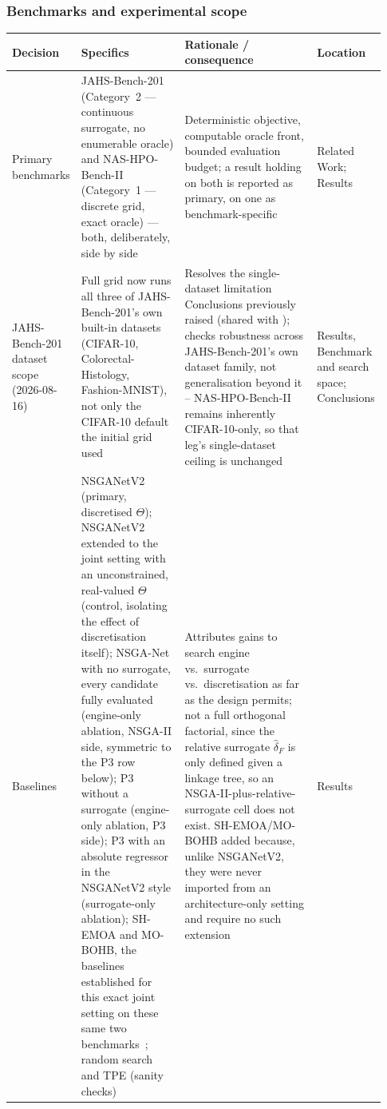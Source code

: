 \subsubsection*{Benchmarks and experimental scope}
\begin{longtable}{p{0.16\linewidth} p{0.28\linewidth} p{0.36\linewidth} p{0.13\linewidth}}
\toprule
\textbf{Decision} & \textbf{Specifics} & \textbf{Rationale / consequence} & \textbf{Location} \\
\midrule
\endhead
Primary benchmarks & JAHS-Bench-201 (Category~2 --- continuous surrogate, no enumerable oracle) and NAS-HPO-Bench-II (Category~1 --- discrete grid, exact oracle) --- both, deliberately, side by side & Deterministic objective, computable oracle front, bounded evaluation budget; a result holding on both is reported as primary, on one as benchmark-specific & Related Work; Results \\
JAHS-Bench-201 dataset scope (2026-08-16) & Full grid now runs all three of JAHS-Bench-201's own built-in datasets (CIFAR-10, Colorectal-Histology, Fashion-MNIST), not only the CIFAR-10 default the initial grid used & Resolves the single-dataset limitation Conclusions previously raised (shared with \citep{bartnik2026evolutionary}); checks robustness across JAHS-Bench-201's own dataset family, not generalisation beyond it -- NAS-HPO-Bench-II remains inherently CIFAR-10-only, so that leg's single-dataset ceiling is unchanged & Results, Benchmark and search space; Conclusions \\
Baselines & NSGANetV2 (primary, discretised $\Theta$); NSGANetV2 extended to the joint setting with an unconstrained, real-valued $\Theta$ (control, isolating the effect of discretisation itself); NSGA-Net with no surrogate, every candidate fully evaluated (engine-only ablation, NSGA-II side, symmetric to the P3 row below); P3 without a surrogate (engine-only ablation, P3 side); P3 with an absolute regressor in the NSGANetV2 style (surrogate-only ablation); SH-EMOA and MO-BOHB, the baselines established for this exact joint setting on these same two benchmarks~\citep{guerreroviu2021bagofbaselines}; random search and TPE (sanity checks) & Attributes gains to search engine vs.\ surrogate vs.\ discretisation as far as the design permits; not a full orthogonal factorial, since the relative surrogate $\hat\delta_F$ is only defined given a linkage tree, so an NSGA-II-plus-relative-surrogate cell does not exist. SH-EMOA/MO-BOHB added because, unlike NSGANetV2, they were never imported from an architecture-only setting and require no such extension & Results \\

\end{longtable}
